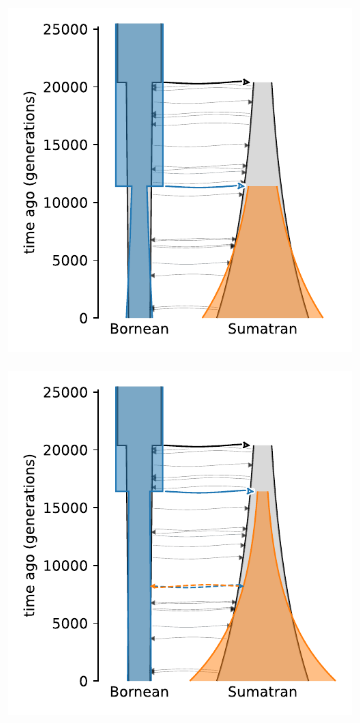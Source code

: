 \begin{figure}[ht]
    \centering
    \begin{subfigure}[b]{0.24\linewidth}
        \centering
        \includegraphics[width=\textwidth]{images_experiments/suimulation_2_stdpopsim/ORAN-PULSE/oran-nomig.pdf}
        \caption{}
        \label{fig:part2:experiments:sim2:results:oran_momi_nomig}
    \end{subfigure}%
    \begin{subfigure}[b]{0.24\linewidth}
        \centering
        \includegraphics[width=\textwidth]{images_experiments/suimulation_2_stdpopsim/ORAN-PULSE/oran-pulse-1.pdf}

\end{subfigure}
\end{figure}
